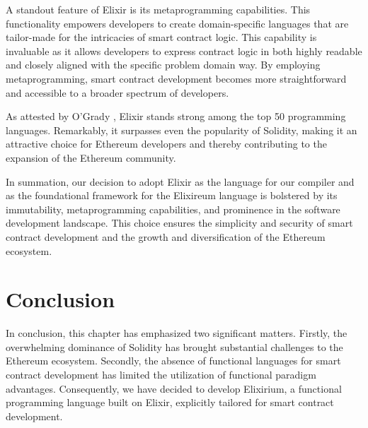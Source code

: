 A standout feature of Elixir is its metaprogramming capabilities. This functionality empowers developers to create domain-specific languages that are tailor-made for the intricacies of smart contract logic. This capability is invaluable as it allows developers to express contract logic in both highly readable and closely aligned with the specific problem domain way. By employing metaprogramming, smart contract development becomes more straightforward and accessible to a broader spectrum of developers.

As attested by O'Grady \cite{RedMonk}, Elixir stands strong among the top 50 programming languages. Remarkably, it surpasses even the popularity of Solidity, making it an attractive choice for Ethereum developers and thereby contributing to the expansion of the Ethereum community.

In summation, our decision to adopt Elixir as the language for our compiler and as the foundational framework for the Elixireum language is bolstered by its immutability, metaprogramming capabilities, and prominence in the software development landscape. This choice ensures the simplicity and security of smart contract development and the growth and diversification of the Ethereum ecosystem.

\section{Conclusion}
\label{sec:conc}

In conclusion, this chapter has emphasized two significant matters. Firstly, the overwhelming dominance of Solidity has brought substantial challenges to the Ethereum ecosystem. Secondly, the absence of functional languages for smart contract development has limited the utilization of functional paradigm advantages. Consequently, we have decided to develop Elixirium, a functional programming language built on Elixir, explicitly tailored for smart contract development.

